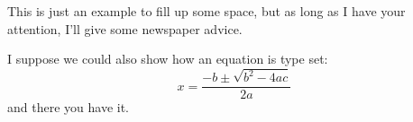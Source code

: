 \documentclass{article}
\date{\today}
\begin{document}
\maketitle

\begin{multicols}{2}

    \lipsum[1]
\closearticle


This is just an example to fill up some space, but as long as I have your attention, I'll give some newspaper advice.

I suppose we could also show how an equation is type set:
\begin{displaymath}
x=\frac{-b\pm\sqrt{b^2-4ac}}{2a}
\end{displaymath}
and there you have it.  

\lipsum[1-4]

\closearticle

\lipsum[1-4]
\closearticle

\end{multicols}
\end{document}
